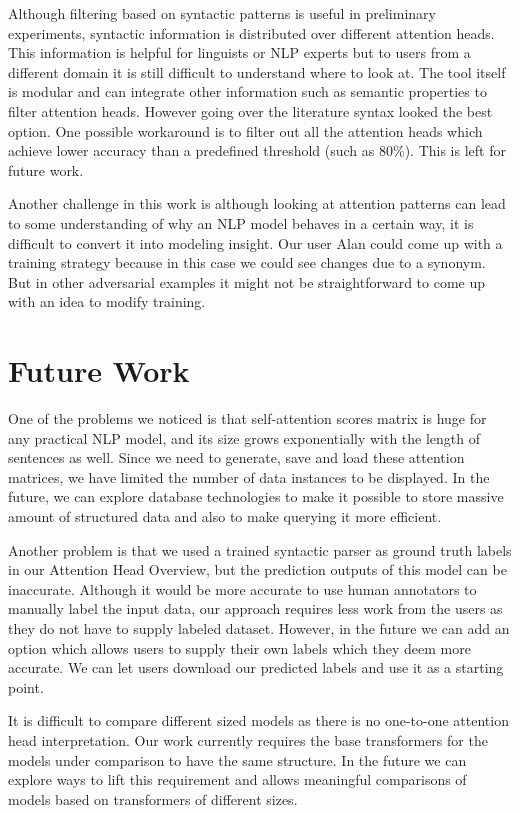 \documentclass[journal]{vgtc}                %
\begin{document}
Although filtering based on syntactic patterns is useful in preliminary experiments, syntactic information is distributed over different attention heads. This information is helpful for linguists or NLP experts but to users from a different domain it is still difficult to understand where to look at. The tool itself is modular and can integrate other information such as semantic properties to filter attention heads. However going over the literature syntax looked the best option. One possible workaround is to filter out all the attention heads which achieve lower accuracy than a predefined threshold (such as 80\%). This is left for future work.

Another challenge in this work is although looking at attention patterns can lead to some understanding of why an NLP model behaves in a certain way, it is difficult to convert it into modeling insight. Our user Alan could come up with a training strategy because in this case we could see changes due to a synonym. But in other adversarial examples it might not be straightforward to come up with an idea to modify training. 



\section{Future Work}
One of the problems we noticed is that self-attention scores matrix is huge for any practical NLP model, and its size grows exponentially with the length of sentences as well. Since we need to generate, save and load these attention matrices, we have limited the number of data instances to be displayed. In the future, we can explore database technologies to make it possible to store massive amount of structured data and also to make querying it more efficient.

Another problem is that we used a trained syntactic parser as ground truth labels in our Attention Head Overview, but the prediction outputs of this model can be inaccurate. Although it would be more accurate to use human annotators to manually label the input data, our approach requires less work from the users as they do not have to supply labeled dataset. However, in the future we can add an option which allows users to supply their own labels which they deem more accurate. We can let users download our predicted labels and use it as a starting point.

It is difficult to compare different sized models as there is no one-to-one attention head interpretation. Our work currently requires the base transformers for the models under comparison to have the same structure. In the future we can explore ways to lift this requirement and allows meaningful comparisons of models based on transformers of different sizes.
\end{document}
